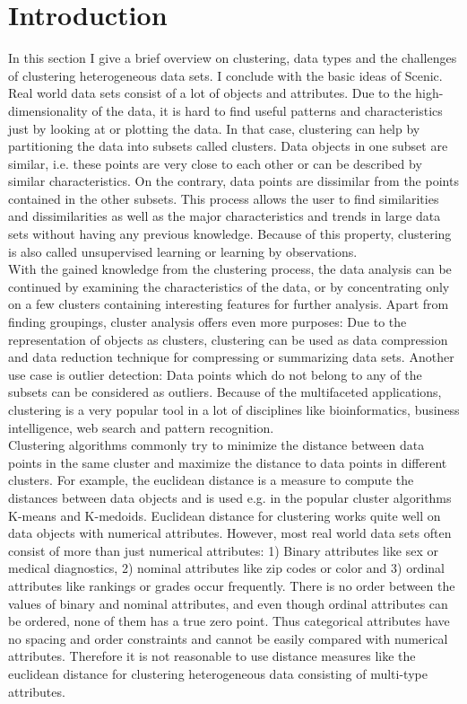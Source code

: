 \documentclass[conference]{IEEEtran}
\begin{document}
\section{Introduction}
In this section I give a brief overview on clustering, data types and the challenges of clustering heterogeneous data sets. I conclude with the basic ideas of Scenic.
\\
Real world data sets consist of a lot of objects and attributes. Due to the high-dimensionality of the data, it is hard to find useful patterns and characteristics just by looking at or plotting the data. In that case, clustering can help by partitioning the data into subsets called clusters. Data objects in one subset are similar, i.e. these points are very close to each other or can be described by similar characteristics. On the contrary, data points are dissimilar from the points contained in the other subsets. This process allows the user to find similarities and dissimilarities as well as the major characteristics and trends in large data sets without having any previous knowledge. Because of this property, clustering is also called unsupervised learning or learning by observations.
\\
With the gained knowledge from the clustering process, the data analysis can be continued by examining the characteristics of the data, or by concentrating only on a few clusters containing interesting features for further analysis. Apart from finding groupings, cluster analysis offers even more purposes: Due to the representation of objects as clusters, clustering can be used as data compression and data reduction technique for compressing or summarizing data sets. Another use case is outlier detection: Data points which do not belong to any of the subsets can be considered as outliers. Because of the multifaceted applications, clustering is a very popular tool in a lot of disciplines like bioinformatics, business intelligence, web search and pattern recognition.\cite{dmconcept_cluster} 
\\
Clustering algorithms commonly try to minimize the distance between data points in the same cluster and maximize the distance to data points in different clusters. For example, the euclidean distance is a measure to compute the distances between data objects and is used e.g. in the popular cluster algorithms K-means and K-medoids. Euclidean distance for clustering works quite well on data objects with numerical attributes. However, most real world data sets often consist of more than just numerical attributes: 1) Binary attributes like sex or medical diagnostics, 2) nominal attributes like zip codes or color and 3) ordinal attributes like rankings or grades occur frequently. There is no order between the values of binary and nominal attributes, and even though ordinal attributes can be ordered, none of them has a true zero point\cite{dmconcept_datatypes}. Thus categorical attributes have no spacing and order constraints and cannot be easily compared with numerical attributes. Therefore it is not reasonable to use distance measures like the euclidean distance for clustering heterogeneous data consisting of multi-type attributes.
\end{document}

